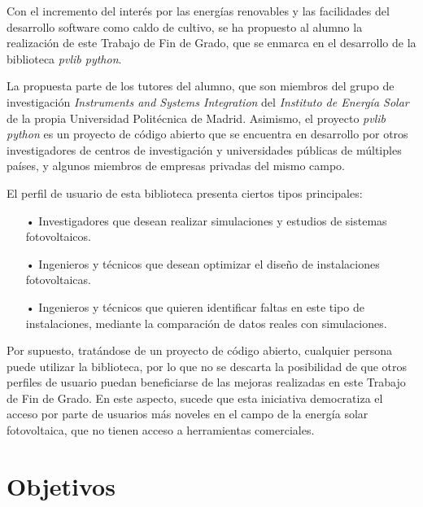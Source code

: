 Con el incremento del interés por las energías renovables y las facilidades del desarrollo software como caldo de cultivo, se ha propuesto al alumno la realización de este Trabajo de Fin de Grado, que se enmarca en el desarrollo de la biblioteca \textit{pvlib python}.

La propuesta parte de los tutores del alumno, que son miembros del grupo de investigación \textit{Instruments and Systems Integration} del \textit{Instituto de Energía Solar} de la propia Universidad Politécnica de Madrid. Asimismo, el proyecto \textit{pvlib python} es un proyecto de código abierto que se encuentra en desarrollo por otros investigadores de centros de investigación y universidades públicas de múltiples países, y algunos miembros de empresas privadas del mismo campo.

El perfil de usuario de esta biblioteca presenta ciertos tipos principales:

\begin{itemize}

    \item[•] Investigadores que desean realizar simulaciones y estudios de sistemas fotovoltaicos.

    \item[•] Ingenieros y técnicos que desean optimizar el diseño de instalaciones fotovoltaicas.

    \item[•] Ingenieros y técnicos que quieren identificar faltas en este tipo de instalaciones, mediante la comparación de datos reales con simulaciones.
    
\end{itemize}

Por supuesto, tratándose de un proyecto de código abierto, cualquier persona puede utilizar la biblioteca, por lo que no se descarta la posibilidad de que otros perfiles de usuario puedan beneficiarse de las mejoras realizadas en este Trabajo de Fin de Grado. En este aspecto, sucede que esta iniciativa democratiza el acceso por parte de usuarios más noveles en el campo de la energía solar fotovoltaica, que no tienen acceso a herramientas comerciales.


\section{Objetivos} \label{sct:intro:objetivos}

